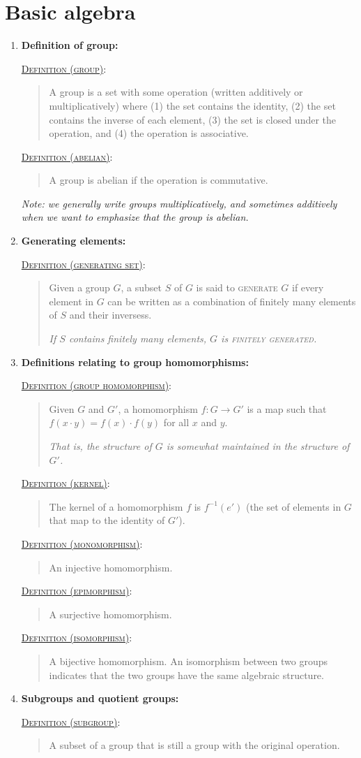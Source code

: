 \documentclass[letterpaper, 12pt]{book}
\newcommand{\defn}[2]{\textsc{\underline{Definition (#1)}:}\begin{quote} #2\end{quote}}
\begin{document}
\section{Basic algebra}
    \begin{enumerate}[resume]
    \item \textbf{Definition of group:}

        \defn{group}{A group is a set with some operation (written additively or multiplicatively) where (1) the set contains the identity, (2) the set contains the inverse of each element, (3) the set is closed under the operation, and (4) the operation is associative.}

        \defn{abelian}{A group is abelian if the operation is commutative.}

        \textit{Note: we generally write groups multiplicatively, and sometimes additively when we want to emphasize that the group is abelian.}
    \item \textbf{Generating elements:}

        \defn{generating set}{Given a group $G$, a subset $S$ of $G$ is said to \textsc{generate} $G$ if every element in $G$ can be written as a combination of finitely many elements of $S$ and their inversess.

        \textit{If $S$ contains finitely many elements, $G$ is \textsc{finitely generated}.}}
    \item \textbf{Definitions relating to group homomorphisms:}

        \defn{group homomorphism}{Given $G$ and $G'$, a homomorphism $f : G\to G'$ is a map such that $f(x\cdot y) = f(x)\cdot f(y)$ for all $x$ and $y$.

        \textit{That is, the structure of $G$ is somewhat maintained in the structure of $G'$.}}

        \defn{kernel}{The kernel of a homomorphism $f$ is $f^{-1}(e')$ (the set of elements in $G$ that map to the identity of $G'$).}

        \defn{monomorphism}{An injective homomorphism.}

        \defn{epimorphism}{A surjective homomorphism.}

        \defn{isomorphism}{A bijective homomorphism. An isomorphism between two groups indicates that the two groups have the same algebraic structure.}
    \item \textbf{Subgroups and quotient groups:}

        \defn{subgroup}{A subset of a group that is still a group with the original operation.}


\end{enumerate}
\end{document}
